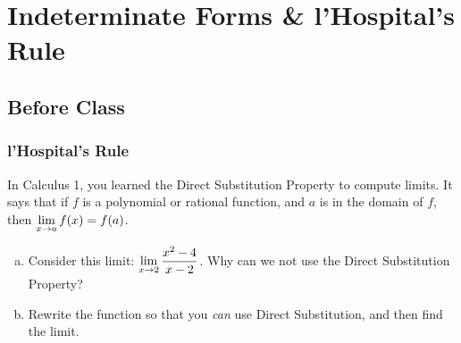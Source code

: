 \documentclass[notes]{subfiles}
\begin{document}
	\setcounter{section}{8}
	\setcounter{ex}{0}
	\fancyhead[LO,RE]{\bfseries \small \currentname}
	\fancyfoot[C]{{}}
	\fancyfoot[RO,LE]{\large \thepage}	%
	
\section*{Indeterminate Forms \& l'Hospital's Rule}\label{cs68}
	\subsection*{Before Class}
	\subsubsection*{l'Hospital's Rule}
		\begin{question}
			In Calculus 1, you learned the Direct Substitution Property to compute limits.  It says that if $f$ is a polynomial or rational function, and $a$ is in the domain of $f$, then $\displaystyle \lim_{x\to a} f(x) = f(a)$.
			\begin{enumerate}[(a)]
				\item Consider this limit: $\displaystyle \lim_{x\to 2} \dfrac{x^2-4}{x-2}$.  Why can we not use the Direct Substitution Property?
					
				\item Rewrite the function so that you \emph{can} use Direct Substitution, and then find the limit.
			\end{enumerate}
		\end{question}
		
\end{document}

